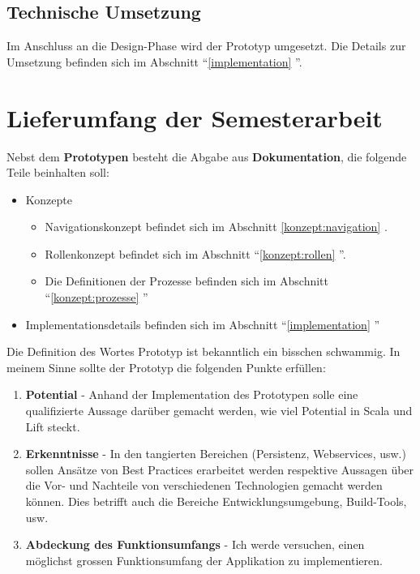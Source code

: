 \subsection{Technische Umsetzung}
Im Anschluss an die Design-Phase wird der Prototyp umgesetzt. Die Details zur Umsetzung befinden sich im Abschnitt ``\ref{implementation} ''.


\section{Lieferumfang der Semesterarbeit}
Nebst dem \textbf{Prototypen} besteht die Abgabe aus \textbf{Dokumentation}, die folgende Teile beinhalten soll:
\begin{itemize}
	\item Konzepte
	\begin{itemize}
		\item Navigationskonzept befindet sich im Abschnitt \ref{konzept:navigation} .
		\item Rollenkonzept befindet sich im Abschnitt ``\ref{konzept:rollen} ''.
		\item Die Definitionen der Prozesse befinden sich im Abschnitt ``\ref{konzept:prozesse} ''
	\end{itemize}
	\item Implementationsdetails befinden sich im Abschnitt ``\ref{implementation} ''
\end{itemize}

Die Definition des Wortes Prototyp ist bekanntlich ein bisschen schwammig. In meinem Sinne sollte der Prototyp die folgenden Punkte erf\"ullen:

\begin{enumerate}
\item \textbf{Potential} - Anhand der Implementation des Prototypen solle eine qualifizierte Aussage dar\"uber gemacht werden, wie viel Potential in Scala und Lift steckt. 

\item \textbf{Erkenntnisse} - In den tangierten Bereichen (Persistenz, Webservices, usw.) sollen Ans\"atze von Best Practices erarbeitet werden respektive Aussagen \"uber die Vor- und Nachteile von verschiedenen Technologien gemacht werden k\"onnen. Dies betrifft auch die Bereiche Entwicklungsumgebung, Build-Tools, usw.

\item \textbf{Abdeckung des Funktionsumfangs} - Ich werde versuchen, einen m\"oglichst grossen Funktionsumfang der Applikation zu implementieren.
\end{enumerate}






